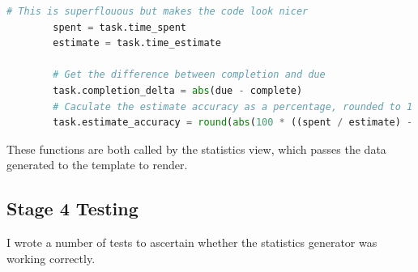 \documentclass{article}
\begin{document}
\begin{lstlisting}[language=Python]
        # This is superflouous but makes the code look nicer
        spent = task.time_spent
        estimate = task.time_estimate

        # Get the difference between completion and due
        task.completion_delta = abs(due - complete)
        # Caculate the estimate accuracy as a percentage, rounded to 1 d.p.
        task.estimate_accuracy = round(abs(100 * ((spent / estimate) - 1)), 1)
\end{lstlisting}

These functions are both called by the statistics view,
which passes the data generated to the template to render.

\subsection{Stage 4 Testing}
I wrote a number of tests to ascertain whether the statistics generator was working correctly.
\end{document}
